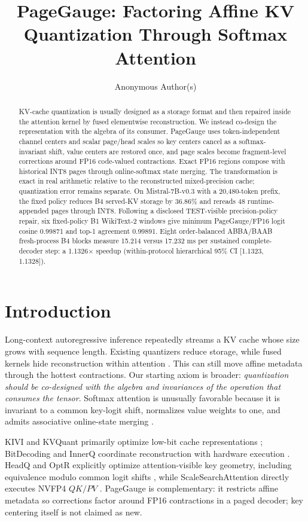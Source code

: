 \documentclass{article}
\title{PageGauge: Factoring Affine KV Quantization Through Softmax Attention}
\author{Anonymous Author(s)}
\newcommand{\method}{PageGauge}
\begin{document}
\maketitle

\begin{abstract}
KV-cache quantization is usually designed as a storage format and then repaired
inside the attention kernel by fused elementwise reconstruction.  We instead
co-design the representation with the algebra of its consumer.  \method{} uses
token-independent channel centers and scalar page/head scales so key centers
cancel as a softmax-invariant shift, value centers are restored once, and page
scales become fragment-level corrections around FP16 code-valued contractions.
Exact FP16 regions compose with historical INT8 pages through online-softmax
state merging.  The transformation is exact in real arithmetic relative to the
reconstructed mixed-precision cache; quantization error remains separate.  On
Mistral-7B-v0.3 with a 20,480-token prefix, the fixed policy reduces B4 served-KV
storage by 36.86\% and rereads 48 runtime-appended pages through INT8.  Following
a disclosed TEST-visible precision-policy repair, six fixed-policy B1
WikiText-2 windows give minimum PageGauge/FP16 logit cosine 0.99871 and top-1
agreement 0.99891.  Eight order-balanced ABBA/BAAB fresh-process B4 blocks
measure 15.214 versus 17.232 ms per sustained complete-decoder step: a
1.1326$\times$ speedup (within-protocol hierarchical 95\% CI [1.1323, 1.1328]).
\end{abstract}

\section{Introduction}

Long-context autoregressive inference repeatedly streams a KV cache whose size
grows with sequence length.  Existing quantizers reduce storage, while fused
kernels hide reconstruction within attention \citep{liu2024kivi,hooper2024kvquant}.
This can still move affine metadata through the hottest contractions.  Our
starting axiom is broader: \emph{quantization should be co-designed with the
algebra and invariances of the operation that consumes the tensor}.  Softmax
attention is unusually favorable because it is invariant to a common key-logit
shift, normalizes value weights to one, and admits associative online-state
merging \citep{dao2022flashattention,dao2024flashattention2}.

KIVI and KVQuant primarily optimize low-bit cache representations
\citep{liu2024kivi,hooper2024kvquant}; BitDecoding and InnerQ coordinate
reconstruction with hardware execution \citep{du2025bitdecoding,hosseini2026innerq}.
HeadQ and OptR explicitly optimize attention-visible key geometry, including
equivalence modulo common logit shifts \citep{williams2026headq,yun2026optr},
while ScaleSearchAttention directly executes NVFP4 $QK/PV$
\citep{gupta2026scalesearch}.  PageGauge is complementary: it restricts affine
metadata so corrections factor around FP16 contractions in a paged decoder;
key centering itself is not claimed as new.
\end{document}

